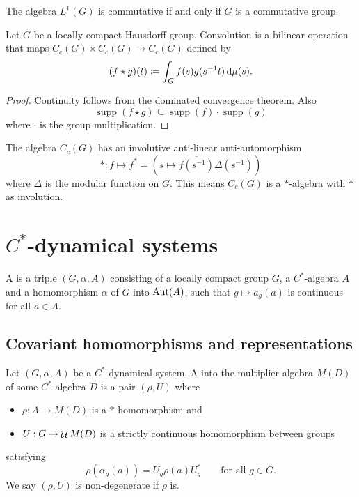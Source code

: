 \begin{proposition}
The algebra $L^1(G)$ is commutative \textup{if and only if} $G$ is a commutative group.
\end{proposition}

\begin{lemma}
Let $G$ be a locally compact Hausdorff group. Convolution is a bilinear operation that maps $C_c(G)\times C_c(G)\to C_c(G)$ defined by
\[ (f\star g)(t) \coloneqq \int_Gf(s)g(s^{-1}t)\operatorname{d \!}\mu(s). \]
\end{lemma}
\begin{proof}
Continuity follows from the dominated convergence theorem. Also
\[ \operatorname{supp}(f\star g)\subseteq \operatorname{supp}(f)\cdot\operatorname{supp}(g) \]
where $\cdot$ is the group multiplication.
\end{proof}
\begin{lemma}
The algebra $C_c(G)$ has an involutive anti-linear anti-automorphism
\[ *: f \mapsto f^* = (s\mapsto \overline{f(s^{-1})}\Delta(s^{-1})) \]
where $\Delta$ is the modular function on $G$. This means $C_c(G)$ is a $*$-algebra with $*$ as involution.
\end{lemma}


\section{$C^*$-dynamical systems}
\begin{definition}
A  is a triple $(G,\alpha, A)$ consisting of a locally  
compact group $G$, a $C^*$-algebra $A$ and a homomorphism $\alpha$ of $G$ into $\operatorname{Aut}(A)$, such that $g \mapsto a_g(a)$ is continuous for all $a \in A$. 
\end{definition}

\subsection{Covariant homomorphisms and representations}
\begin{definition}
Let $(G,\alpha, A)$ be a $C^*$-dynamical system. A  into the multiplier algebra $M(D)$ of some $C^*$-algebra $D$ is a pair $(\rho, U)$ where
\begin{itemize}
\item $\rho: A\to M(D)$ is a $*$-homomorphism and
\item $U: G\to \mathop{\mathcal{U}}\nolimits M(D)$ is a strictly continuous homomorphism between groups
\end{itemize}
satisfying
\[ \rho(\alpha_g(a))= U_g\rho(a)U_{g}^* \qquad \text{for all $g\in G$.} \]
We say $(\rho, U)$ is non-degenerate if $\rho$ is.
\end{definition}

